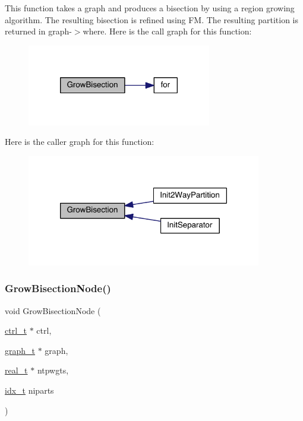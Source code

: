 This function takes a graph and produces a bisection by using a region growing algorithm. The resulting bisection is refined using FM. The resulting partition is returned in graph-\/$>$where. Here is the call graph for this function\+:\nopagebreak
\begin{figure}[H]
\begin{center}
\leavevmode
\includegraphics[width=228pt]{a00945_aa565fcd8af582579b67153287a07ea69_cgraph}
\end{center}
\end{figure}
Here is the caller graph for this function\+:\nopagebreak
\begin{figure}[H]
\begin{center}
\leavevmode
\includegraphics[width=290pt]{a00945_aa565fcd8af582579b67153287a07ea69_icgraph}
\end{center}
\end{figure}
\mbox{\label{a00945_a5882ab0f565a5e97581ad5c4847effbc}} 
\subsubsection{\texorpdfstring{Grow\+Bisection\+Node()}{GrowBisectionNode()}}
{\footnotesize\ttfamily void Grow\+Bisection\+Node (\begin{DoxyParamCaption}\item[{\hyperlink{a00742}{ctrl\+\_\+t} $\ast$}]{ctrl,  }\item[{\hyperlink{a00734}{graph\+\_\+t} $\ast$}]{graph,  }\item[{\hyperlink{a00876_a1924a4f6907cc3833213aba1f07fcbe9}{real\+\_\+t} $\ast$}]{ntpwgts,  }\item[{\hyperlink{a00876_aaa5262be3e700770163401acb0150f52}{idx\+\_\+t}}]{niparts }\end{DoxyParamCaption})}

